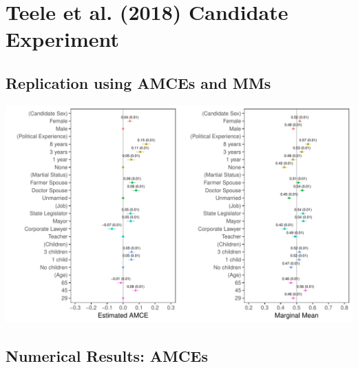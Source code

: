 \documentclass[a4paper,12pt]{article}\usepackage[]{graphicx}\usepackage[]{color}
\makeatletter
\def\maxwidth{ %
  \ifdim\Gin@nat@width>\linewidth
    \linewidth
  \else
    \Gin@nat@width
  \fi
}
\newenvironment{knitrout}{}{} %
\makeatother
\begin{document}
\clearpage


\section{Teele et al. (2018) Candidate Experiment}\label{app:tkr}

\subsection{Replication using AMCEs and MMs}

\begin{knitrout}
\color{fgcolor}
\includegraphics[width=\maxwidth]{figure/tkr_amce_appendix-1} 

\end{knitrout}

\clearpage

\subsection{Numerical Results: AMCEs}
\end{document}
